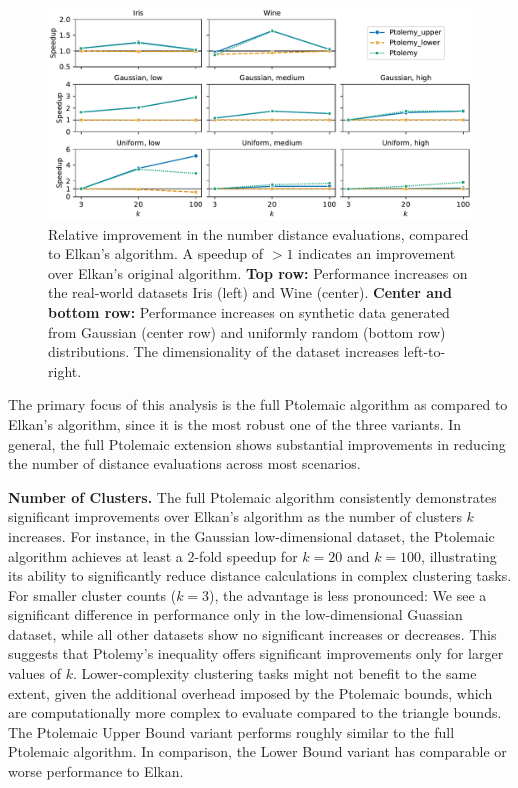 \begin{figure}[h]
	\centering
	\includegraphics[width=\textwidth]{fig/combined_plot.pdf}
	\caption{
		Relative improvement in the number distance evaluations, compared to Elkan's algorithm.
        A speedup of $>1$ indicates an improvement over Elkan's original algorithm.
		\textbf{Top row:} Performance increases on the real-world datasets Iris (left) and Wine (center).
		\textbf{Center and bottom row:} Performance increases on synthetic data generated from Gaussian (center row) and uniformly random (bottom row) distributions.
		The dimensionality of the dataset increases left-to-right.
	}
	\label{fig:combined}
\end{figure}


The primary focus of this analysis is the full Ptolemaic algorithm as compared to Elkan's algorithm, since it is the most robust one of the three variants. 
In general, the full Ptolemaic extension shows substantial improvements in reducing the number of distance evaluations across most scenarios.

\textbf{Number of Clusters.}
The full Ptolemaic algorithm consistently demonstrates significant improvements over Elkan’s algorithm as the number of clusters $k$ increases.
For instance, in the Gaussian low-dimensional dataset, the Ptolemaic algorithm achieves at least a 2-fold speedup for $k = 20$ and $k = 100$, illustrating its ability to significantly reduce distance calculations in complex clustering tasks.
For smaller cluster counts ($k = 3$), the advantage is less pronounced: We see a significant difference in performance only in the low-dimensional Guassian dataset, while all other datasets show no significant increases or decreases.
This suggests that Ptolemy's inequality offers significant improvements only for larger values of $k$.
Lower-complexity clustering tasks might not benefit to the same extent,
given the additional overhead imposed by the Ptolemaic bounds, which are computationally more complex to evaluate compared to the triangle bounds.
The Ptolemaic Upper Bound variant performs roughly similar to the full Ptolemaic algorithm.
In comparison, the Lower Bound variant has comparable or worse performance to Elkan.

